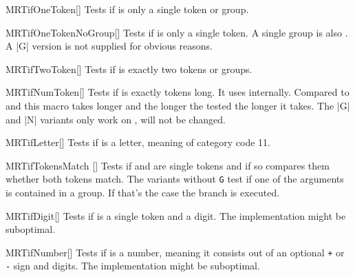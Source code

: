 \begin{describemacroTF}[G,N,GN]{MRTifOneToken}[]
  Tests if  is only a single token or group.
\end{describemacroTF}

\begin{describemacroTF}[N]{MRTifOneTokenNoGroup}[]
  Tests if  is only a single token. A single group is also
  . A |G| version is not supplied for obvious reasons.
\end{describemacroTF}

\begin{describemacroTF}[G,N,GN]{MRTifTwoToken}[]
  Tests if  is exactly two tokens or groups.
\end{describemacroTF}

\begin{describemacroTF}[G,N,GN]{MRTifNumToken}[]
  Tests if  is exactly  tokens long. It uses
   internally. Compared to  and
   this macro takes longer and the longer the tested
   the longer it takes. The |G| and |N| variants only work on
  ,  will not be changed.
\end{describemacroTF}

\begin{describemacroTF}[G,N,GN]{MRTifLetter}[]
  Tests if  is a letter, meaning of category code 11.
\end{describemacroTF}

\begin{describemacroTF}{MRTifTokensMatch}%
  []
  Tests if  and  are single tokens and if so compares
  them whether both tokens match. The variants without \texttt{G} test if one of
  the arguments is contained in a group. If that's the case the 
  branch is executed.
\end{describemacroTF}

\begin{describemacroTF}[G,N,GN]{MRTifDigit}[]
  Tests if  is a single token and a digit. The implementation might be
  suboptimal.
\end{describemacroTF}

\begin{describemacroTF}[G,N,GN]{MRTifNumber}[]
  Tests if  is a number, meaning it consists out of an optional
  \texttt{+} or \texttt{-} sign and digits. The implementation might be
  suboptimal.
\end{describemacroTF}

